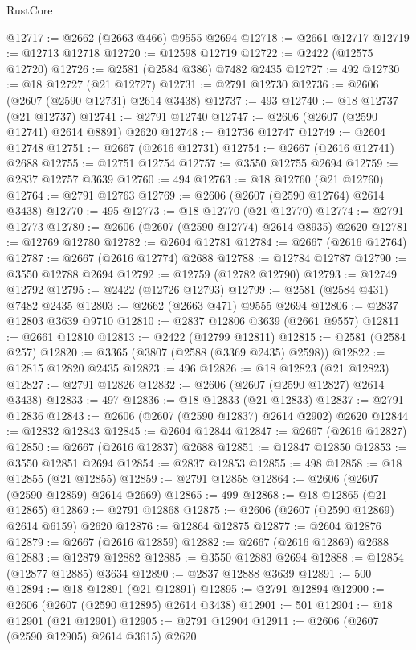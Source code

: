\begin{lexlean}{RustCore}
\begin{coremodule}
@12717 := @2662 (@2663 @466) @9555 @2694
@12718 := @2661 @12717
@12719 := @12713 @12718
@12720 := @12598 @12719
@12722 := @2422 (@12575 @12720)
@12726 := @2581 (@2584 @386) @7482 @2435
@12727 := 492
@12730 := @18 @12727 (@21 @12727)
@12731 := @2791 @12730
@12736 := @2606 (@2607 (@2590 @12731) @2614 @3438)
@12737 := 493
@12740 := @18 @12737 (@21 @12737)
@12741 := @2791 @12740
@12747 := @2606 (@2607 (@2590 @12741) @2614 @8891) @2620
@12748 := @12736 @12747
@12749 := @2604 @12748
@12751 := @2667 (@2616 @12731)
@12754 := @2667 (@2616 @12741) @2688
@12755 := @12751 @12754
@12757 := @3550 @12755 @2694
@12759 := @2837 @12757 @3639
@12760 := 494
@12763 := @18 @12760 (@21 @12760)
@12764 := @2791 @12763
@12769 := @2606 (@2607 (@2590 @12764) @2614 @3438)
@12770 := 495
@12773 := @18 @12770 (@21 @12770)
@12774 := @2791 @12773
@12780 := @2606 (@2607 (@2590 @12774) @2614 @8935) @2620
@12781 := @12769 @12780
@12782 := @2604 @12781
@12784 := @2667 (@2616 @12764)
@12787 := @2667 (@2616 @12774) @2688
@12788 := @12784 @12787
@12790 := @3550 @12788 @2694
@12792 := @12759 (@12782 @12790)
@12793 := @12749 @12792
@12795 := @2422 (@12726 @12793)
@12799 := @2581 (@2584 @431) @7482 @2435
@12803 := @2662 (@2663 @471) @9555 @2694
@12806 := @2837 @12803 @3639 @9710
@12810 := @2837 @12806 @3639 (@2661 @9557)
@12811 := @2661 @12810
@12813 := @2422 (@12799 @12811)
@12815 := @2581 (@2584 @257)
@12820 := @3365 (@3807 (@2588 (@3369 @2435) @2598))
@12822 := @12815 @12820 @2435
@12823 := 496
@12826 := @18 @12823 (@21 @12823)
@12827 := @2791 @12826
@12832 := @2606 (@2607 (@2590 @12827) @2614 @3438)
@12833 := 497
@12836 := @18 @12833 (@21 @12833)
@12837 := @2791 @12836
@12843 := @2606 (@2607 (@2590 @12837) @2614 @2902) @2620
@12844 := @12832 @12843
@12845 := @2604 @12844
@12847 := @2667 (@2616 @12827)
@12850 := @2667 (@2616 @12837) @2688
@12851 := @12847 @12850
@12853 := @3550 @12851 @2694
@12854 := @2837 @12853
@12855 := 498
@12858 := @18 @12855 (@21 @12855)
@12859 := @2791 @12858
@12864 := @2606 (@2607 (@2590 @12859) @2614 @2669)
@12865 := 499
@12868 := @18 @12865 (@21 @12865)
@12869 := @2791 @12868
@12875 := @2606 (@2607 (@2590 @12869) @2614 @6159) @2620
@12876 := @12864 @12875
@12877 := @2604 @12876
@12879 := @2667 (@2616 @12859)
@12882 := @2667 (@2616 @12869) @2688
@12883 := @12879 @12882
@12885 := @3550 @12883 @2694
@12888 := @12854 (@12877 @12885) @3634
@12890 := @2837 @12888 @3639
@12891 := 500
@12894 := @18 @12891 (@21 @12891)
@12895 := @2791 @12894
@12900 := @2606 (@2607 (@2590 @12895) @2614 @3438)
@12901 := 501
@12904 := @18 @12901 (@21 @12901)
@12905 := @2791 @12904
@12911 := @2606 (@2607 (@2590 @12905) @2614 @3615) @2620

\end{coremodule}
\end{lexlean}
